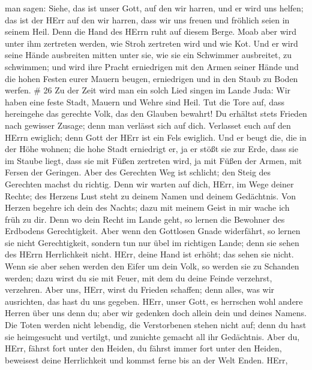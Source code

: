 man sagen: Siehe, das ist unser Gott, auf den wir harren, und er wird
uns helfen; das ist der HErr auf den wir harren, dass wir uns freuen und
fröhlich seien in seinem Heil.  Denn die Hand des HErrn
ruht auf diesem Berge. Moab aber wird unter ihm zertreten werden, wie
Stroh zertreten wird und wie Kot.  Und er wird seine Hände
ausbreiten mitten unter sie, wie sie ein Schwimmer ausbreitet, zu
schwimmen; und wird ihre Pracht erniedrigen mit den Armen seiner Hände
 und die hohen Festen eurer Mauern beugen, erniedrigen und
in den Staub zu Boden werfen. \# 26  Zu der Zeit wird man
ein solch Lied singen im Lande Juda: Wir haben eine feste Stadt, Mauern
und Wehre sind Heil.  Tut die Tore auf, dass hereingehe das
gerechte Volk, das den Glauben bewahrt!  Du erhältst stets
Frieden nach gewisser Zusage; denn man verlässt sich auf dich.
 Verlasset euch auf den HErrn ewiglich; denn Gott der HErr
ist ein Fels ewiglich.  Und er beugt die, die in der Höhe
wohnen; die hohe Stadt erniedrigt er, ja er stößt sie zur Erde, dass sie
im Staube liegt,  dass sie mit Füßen zertreten wird, ja mit
Füßen der Armen, mit Fersen der Geringen.  Aber des
Gerechten Weg ist schlicht; den Steig des Gerechten machst du richtig.
 Denn wir warten auf dich, HErr, im Wege deiner Rechte; des
Herzens Lust steht zu deinem Namen und deinem Gedächtnis. 
Von Herzen begehre ich dein des Nachts; dazu mit meinem Geist in mir
wache ich früh zu dir. Denn wo dein Recht im Lande geht, so lernen die
Bewohner des Erdbodens Gerechtigkeit.  Aber wenn den
Gottlosen Gnade widerfährt, so lernen sie nicht Gerechtigkeit, sondern
tun nur übel im richtigen Lande; denn sie sehen des HErrn Herrlichkeit
nicht.  HErr, deine Hand ist erhöht; das sehen sie nicht.
Wenn sie aber sehen werden den Eifer um dein Volk, so werden sie zu
Schanden werden; dazu wirst du sie mit Feuer, mit dem du deine Feinde
verzehrst, verzehren.  Aber uns, HErr, wirst du Frieden
schaffen; denn alles, was wir ausrichten, das hast du uns gegeben.
 HErr, unser Gott, es herrschen wohl andere Herren über uns
denn du; aber wir gedenken doch allein dein und deines Namens.
 Die Toten werden nicht lebendig, die Verstorbenen stehen
nicht auf; denn du hast sie heimgesucht und vertilgt, und zunichte
gemacht all ihr Gedächtnis.  Aber du, HErr, fährst fort
unter den Heiden, du fährst immer fort unter den Heiden, beweisest deine
Herrlichkeit und kommst ferne bis an der Welt Enden.  HErr,
